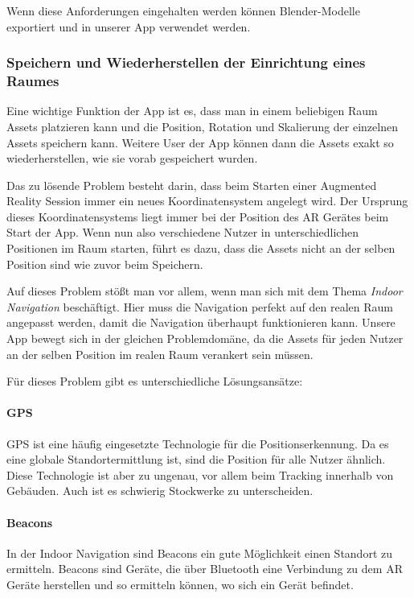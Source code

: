 \documentclass[titlepage, a4paper, 11pt]{scrartcl}
\begin{document}
  Wenn diese Anforderungen eingehalten werden können Blender-Modelle exportiert und in unserer App verwendet werden.

  \subsubsection{Speichern und Wiederherstellen der Einrichtung eines Raumes}

  Eine wichtige Funktion der App ist es, dass man in einem beliebigen Raum Assets platzieren kann und die Position, Rotation und Skalierung der einzelnen Assets speichern kann.
  Weitere User der App können dann die Assets exakt so wiederherstellen, wie sie vorab gespeichert wurden.

  Das zu lösende Problem besteht darin, dass beim Starten einer Augmented Reality Session immer ein neues Koordinatensystem angelegt wird.
  Der Ursprung dieses Koordinatensystems liegt immer bei der Position des AR Gerätes beim Start der App.
  Wenn nun also verschiedene Nutzer in unterschiedlichen Positionen im Raum starten, führt es dazu, dass die Assets nicht an der selben Position sind wie zuvor beim Speichern.
  
  Auf dieses Problem stößt man vor allem, wenn man sich mit dem Thema \textit{Indoor Navigation} beschäftigt. Hier muss die Navigation perfekt auf den realen Raum angepasst werden, damit die Navigation überhaupt funktionieren kann.
  Unsere App bewegt sich in der gleichen Problemdomäne, da die Assets für jeden Nutzer an der selben Position im realen Raum verankert sein müssen.

  Für dieses Problem gibt es unterschiedliche Lösungsansätze:

  \paragraph{GPS}
  GPS ist eine häufig eingesetzte Technologie für die Positionserkennung. Da es eine globale Standortermittlung ist, sind die Position für alle Nutzer ähnlich.
  Diese Technologie ist aber zu ungenau, vor allem beim Tracking innerhalb von Gebäuden. Auch ist es schwierig Stockwerke zu unterscheiden.

  \paragraph{Beacons}
  In der Indoor Navigation sind Beacons ein gute Möglichkeit einen Standort zu ermitteln. Beacons sind Geräte, die über Bluetooth eine Verbindung zu dem AR Geräte herstellen und so ermitteln können, wo sich ein Gerät befindet.
\end{document}
